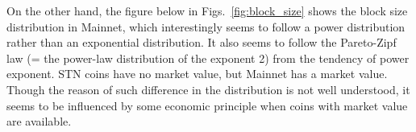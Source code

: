 \documentclass[graybox]{svmult}
\begin{document}
On the other hand, the figure below in Figs.~\ref{fig:block_size} shows the block size distribution in Mainnet, which interestingly seems to follow a power distribution rather than an exponential distribution.
It also seems to follow the Pareto-Zipf law (= the power-law distribution of the exponent 2) from the tendency of power exponent. 
STN coins have no market value, but Mainnet has a market value.
Though the reason of such difference in the distribution is not well understood, it seems to be influenced by some economic principle when coins with market value are available.
\end{document}
